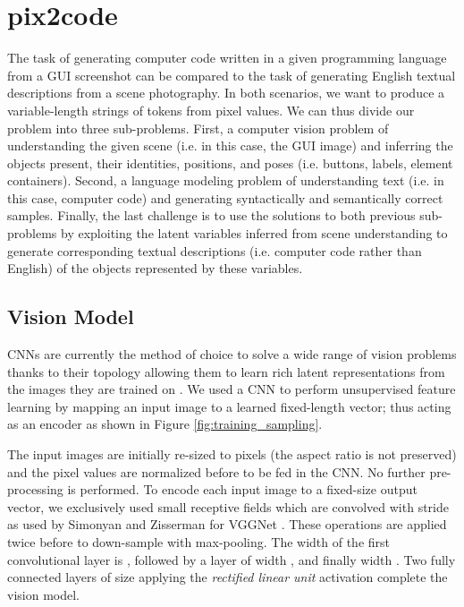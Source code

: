 \documentclass{article}
\begin{document}
\section{pix2code}

The task of generating computer code written in a given programming language from a GUI screenshot can be compared to the task of generating English textual descriptions from a scene photography. In both scenarios, we want to produce a variable-length strings of tokens from pixel values. We can thus divide our problem into three sub-problems. First, a computer vision problem of understanding the given scene (i.e. in this case, the GUI image) and inferring the objects present, their identities, positions, and poses (i.e. buttons, labels, element containers). Second, a language modeling problem of understanding text (i.e. in this case, computer code) and generating syntactically and semantically correct samples. Finally, the last challenge is to use the solutions to both previous sub-problems by exploiting the latent variables inferred from scene understanding to generate corresponding textual descriptions (i.e. computer code rather than English) of the objects represented by these variables.

\subsection{Vision Model}

CNNs are currently the method of choice to solve a wide range of vision problems thanks to their topology allowing them to learn rich latent representations from the images they are trained on \cite{sermanet2013overfeat, krizhevsky2012imagenet}. We used a CNN to perform unsupervised feature learning by mapping an input image to a learned fixed-length vector; thus acting as an encoder as shown in Figure \ref{fig:training_sampling}.

The input images are initially re-sized to  pixels (the aspect ratio is not preserved) and the pixel values are normalized before to be fed in the CNN. No further pre-processing is performed. To encode each input image to a fixed-size output vector, we exclusively used small  receptive fields which are convolved with stride  as used by Simonyan and Zisserman for VGGNet \cite{simonyan2014very}. These operations are applied twice before to down-sample with max-pooling. The width of the first convolutional layer is , followed by a layer of width , and finally width . Two fully connected layers of size  applying the \emph{rectified linear unit} activation complete the vision model.
\end{document}
